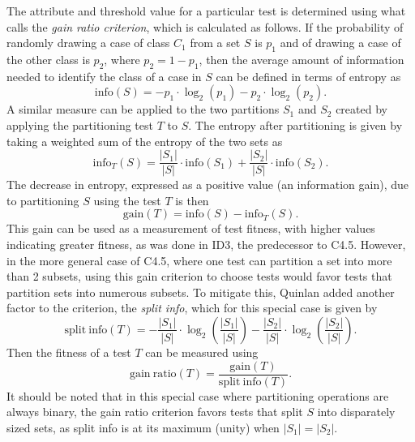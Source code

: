 \documentclass[main.tex]{subfiles}
\begin{document}
The attribute and threshold value for a particular test is determined using what \citet{quinlan:1993} calls the \textit{gain ratio criterion}, which is calculated as follows. If the probability of randomly drawing a case of class $C_1$ from a set $S$ is $p_1$ and of drawing a case of the other class is $p_2$, where $p_2 = 1-p_1$, then the average amount of information needed to identify the class of a case in $S$ can be defined in terms of entropy as
\begin{equation}
\mathrm{info}(S)=-p_1 \cdot \log_2(p_1) - p_2 \cdot \log_2(p_2).
\end{equation}
A similar measure can be applied to the two partitions $S_1$ and $S_2$ created by applying the partitioning test $T$ to $S$. The entropy after partitioning is given by taking a weighted sum of the entropy of the two sets as
\begin{equation}
\mathrm{info}_T(S)=\frac{|S_1|}{|S|} \cdot \mathrm{info}(S_1) + \frac{|S_2|}{|S|} \cdot \mathrm{info}(S_2).
\end{equation}
The decrease in entropy, expressed as a positive value (an information gain), due to partitioning $S$ using the test $T$ is then
\begin{equation}
\mathrm{gain}(T)=\mathrm{info}(S)-\mathrm{info}_T(S).
\end{equation}
This gain can be used as a measurement of test fitness, with higher values indicating greater fitness, as was done in ID3, the predecessor to C4.5. However, in the more general case of C4.5, where one test can partition a set into more than 2 subsets, using this gain criterion to choose tests would favor tests that partition sets into numerous subsets. To mitigate this, Quinlan added another factor to the criterion, the \textit{split info}, which for this special case is given by
\begin{equation}
\mathrm{split\ info}(T)= -\frac{|S_1|}{|S|} \cdot \log_2 \left( \frac{|S_1|}{|S|} \right) - \frac{|S_2|}{|S|} \cdot \log_2  \left( \frac{|S_2|}{|S|}  \right).
\end{equation}
Then the fitness of a test $T$ can be measured using
\begin{equation}
\mathrm{gain\ ratio}(T) = \frac{\mathrm{gain}(T)}{\mathrm{split\ info}(T)}.
\end{equation}
It should be noted that in this special case where partitioning operations are always binary, the gain ratio criterion favors tests that split $S$ into disparately sized sets, as split info is at its maximum (unity) when $|S_1|=|S_2|$.
\end{document}
